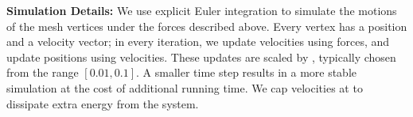 \medskip
\textbf{Simulation Details:} 
We use explicit Euler integration to simulate the motions of the mesh vertices under the
forces described above.  Every vertex has a position and a velocity vector; in
every iteration, we update velocities using forces, and update positions using
velocities.  These updates are scaled by , typically
chosen from the range $[0.01,0.1]$.  A smaller time step results in a more
stable simulation at the cost of additional running time.  We cap velocities
at  to dissipate extra energy from the system.

